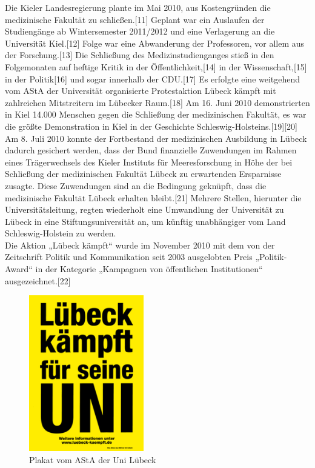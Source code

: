 \documentclass[a4paper]{article}
\begin{document}
\noindent Die Kieler Landesregierung plante im Mai 2010, aus Kostengründen die medizinische Fakultät zu schließen.[11] Geplant war ein Auslaufen der Studiengänge ab Wintersemester 2011/2012 und eine Verlagerung an die Universität Kiel.[12] Folge war eine Abwanderung der Professoren, vor allem aus der Forschung.[13] Die Schließung des Medizinstudienganges stieß in den Folgemonaten auf heftige Kritik in der Öffentlichkeit,[14] in der Wissenschaft,[15] in der Politik[16] und sogar innerhalb der CDU.[17] Es erfolgte eine weitgehend vom AStA der Universität organisierte Protestaktion Lübeck kämpft mit zahlreichen Mitstreitern im Lübecker Raum.[18] Am 16. Juni 2010 demonstrierten in Kiel 14.000 Menschen gegen die Schließung der medizinischen Fakultät, es war die größte Demonstration in Kiel in der Geschichte Schleswig-Holsteins.[19][20] Am 8. Juli 2010 konnte der Fortbestand der medizinischen Ausbildung in Lübeck dadurch gesichert werden, dass der Bund finanzielle Zuwendungen im Rahmen eines Trägerwechsels des Kieler Instituts für Meeresforschung in Höhe der bei Schließung der medizinischen Fakultät Lübeck zu erwartenden Ersparnisse zusagte. Diese Zuwendungen sind an die Bedingung geknüpft, dass die medizinische Fakultät Lübeck erhalten bleibt.[21] Mehrere Stellen, hierunter die Universitätsleitung, regten wiederholt eine Umwandlung der Universität zu Lübeck in eine Stiftungsuniversität an, um künftig unabhängiger vom Land Schleswig-Holstein zu werden.\\
\newpage
\noindent Die Aktion „Lübeck kämpft“\cite{de_la_torre_approach} wurde im November 2010 mit dem von der Zeitschrift Politik und Kommunikation seit 2003 ausgelobten Preis „Politik-Award“ in der Kategorie „Kampagnen von öffentlichen Institutionen“ ausgezeichnet.[22]\\
\begin{figure}
\centerline{\includegraphics[width=5cm]{kampf}}
\caption{Plakat vom AStA der Uni Lübeck}
\end{figure}\\
\end{document}
